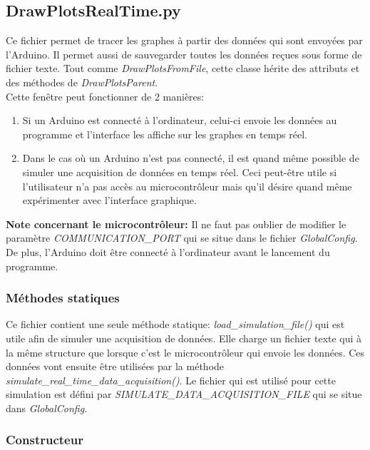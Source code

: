 \subsection{DrawPlotsRealTime.py}

Ce fichier permet de tracer les graphes à partir des données qui sont envoyées par l'Arduino. Il permet aussi de sauvegarder toutes les données reçues sous forme de fichier texte. Tout comme \textit{DrawPlotsFromFile}, cette classe hérite des attributs et des méthodes de \textit{DrawPlotsParent}.\\

Cette fenêtre peut fonctionner de 2 manières:
\begin{enumerate}
    \item Si un Arduino est connecté à l'ordinateur, celui-ci envoie les données au programme et l'interface les affiche sur les graphes en temps réel.
    \item Dans le cas où un Arduino n'est pas connecté, il est quand même possible de simuler une acquisition de données en temps réel. Ceci peut-être utile si l'utilisateur n'a pas accès au microcontrôleur mais qu'il désire quand même expérimenter avec l'interface graphique.\\
\end{enumerate}

\textbf{Note concernant le microcontrôleur:} Il ne faut pas oublier de modifier le paramètre \textit{COMMUNICATION\_PORT} qui se situe dans le fichier \textit{GlobalConfig}. De plus, l'Arduino doit être connecté à l'ordinateur avant le lancement du programme.

\subsubsection{Méthodes statiques}

Ce fichier contient une seule méthode statique: \textit{load\_simulation\_file()} qui est utile afin de simuler une acquisition de données. Elle charge un fichier texte qui à la même structure que lorsque c'est le microcontrôleur qui envoie les données. Ces données vont ensuite être utilisées par la méthode \textit{simulate\_real\_time\_data\_acquisition()}. Le fichier qui est utilisé pour cette simulation est défini par \textit{SIMULATE\_DATA\_ACQUISITION\_FILE} qui se situe dans \textit{GlobalConfig}.

\subsubsection{Constructeur}

